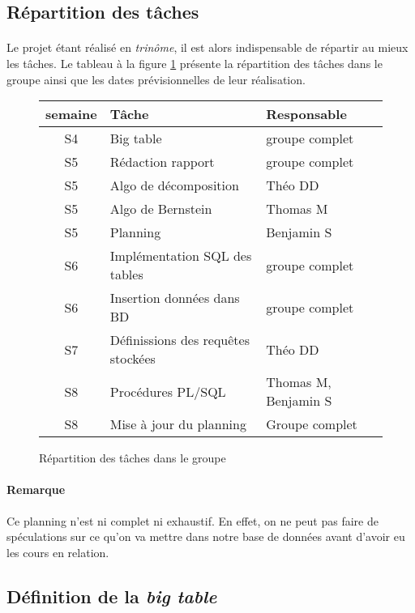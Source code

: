 \subsection{Répartition des tâches}

\paragraph{}{
    Le projet étant réalisé en \textit{trinôme}, il est alors indispensable de répartir au mieux les tâches.
    Le tableau à la figure \ref{planning} présente la répartition des tâches dans le groupe ainsi que les dates prévisionnelles
    de leur réalisation.
}

\begin{figure}
\centering
    \begin{tabular}{|c|p{16em}|p{12em}|}
    	\hline \textbf{semaine} & \textbf{Tâche} & \textbf{Responsable} \\ 
    	\hline S4 & Big table & groupe complet \\ 
    	\hline S5 & Rédaction rapport & groupe complet \\ 
    	\hline S5 & Algo de décomposition & Théo DD \\ 
    	\hline S5 & Algo de Bernstein & Thomas M \\ 
    	\hline S5 & Planning & Benjamin S \\ 
    	\hline S6 & Implémentation SQL des tables & groupe complet \\
    	\hline S6 & Insertion données dans BD & groupe complet \\ 
    	\hline S7 & Définissions des requêtes stockées & Théo DD \\ 
    	\hline S8 & Procédures PL/SQL & Thomas M, Benjamin S \\ 
    	\hline S8 & Mise à jour du planning & Groupe complet \\ 
    	\hline 
    \end{tabular} 
\caption{Répartition des tâches dans le groupe}
\label{planning}
\end{figure}

\paragraph{Remarque}{
    Ce planning n'est ni complet ni exhaustif. En effet, on ne peut pas faire de spéculations sur ce qu'on va mettre dans notre base de données avant d'avoir eu les cours en relation.
}

\subsection{Définition de la \textit{big table}}

